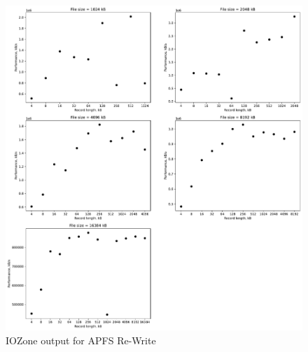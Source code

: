 \begin{figure}[!htb]
	\label{fig:app_bench_apfs_re_write}
	\begin{center}
		\includegraphics[width=1.0\textwidth]{figures/benchmarking/local/Re-Write.pdf}
	\end{center}
	\caption{IOZone output for \gls{APFS} \mbox{Re-Write}}
\end{figure}

